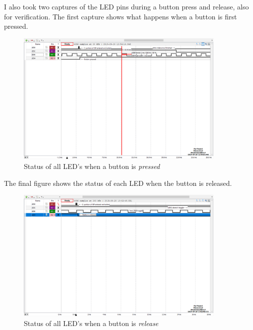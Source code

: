 \documentclass[a4paper, 12pt]{article}
\begin{document}
I also took two captures of the LED pins during a button press and release, also for verification. The first capture shows what happens when a button is first pressed. 

\begin{figure}[H]
\centering
\includegraphics[width=0.9\textwidth]{pic-button-press.png}
\caption{Status of all LED's when a button is \emph{pressed}}
\label{fig:pic-button-press}
\end{figure}

The final figure shows the status of each LED when the button is released.

\begin{figure}[H]
\centering
\includegraphics[width=0.9\textwidth]{pic-button-release.png}
\caption{Status of all LED's when a button is \emph{release}}
\label{fig:pic-button-release}
\end{figure}
\end{document}
